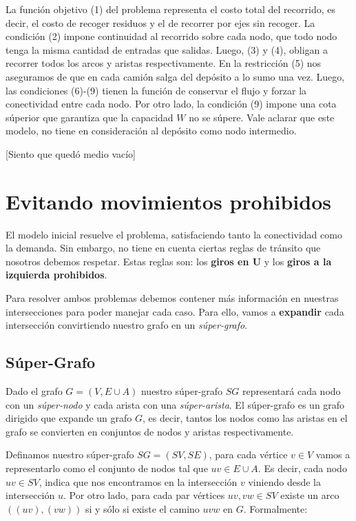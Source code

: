 La función objetivo (1) del problema representa el costo total del recorrido, es decir, el costo 
de recoger residuos y el de recorrer por ejes sin recoger. La condición (2) impone continuidad al 
recorrido sobre cada nodo, que todo nodo tenga la misma cantidad de entradas que salidas. 
Luego, (3) y (4), obligan a recorrer todos los arcos y aristas respectivamente. 
En la restricción (5) nos aseguramos de que en cada camión salga del depósito a lo sumo una vez. 
Luego, las condiciones (6)-(9) tienen la función de conservar el flujo y forzar la conectividad entre cada nodo. 
Por otro lado, la condición (9) impone una cota súperior que garantiza que la capacidad $W$ no se súpere. 
Vale aclarar que este modelo, no tiene en consideración al depósito como nodo intermedio.

[Siento que quedó medio vacío]

\section{Evitando movimientos prohibidos}

El modelo inicial resuelve el problema, satisfaciendo tanto la conectividad como la demanda. 
Sin embargo, no tiene en cuenta ciertas reglas de tránsito que nosotros debemos respetar. 
Estas reglas son: los \textbf{giros en U} y los \textbf{giros a la izquierda prohibidos}.

\vspace{3mm}


Para resolver ambos problemas debemos contener más información en nuestras intersecciones para poder manejar 
cada caso. Para ello, vamos a \textbf{expandir} cada intersección convirtiendo nuestro grafo en un 
\textit{súper-grafo}.  

\subsection{Súper-Grafo}

Dado el grafo $G = (V, E \cup A)$ nuestro súper-grafo $SG$ representará cada nodo con un \textit{súper-nodo} 
y cada arista con una \textit{súper-arista}. El súper-grafo es un grafo dirigido que expande un grafo $G$, 
es decir, tantos los nodos como las aristas en el grafo se convierten en conjuntos de nodos y aristas 
respectivamente. 

\vspace{3mm}

Definamos nuestro súper-grafo $SG = (SV,SE)$, para cada vértice $v \in V$ vamos a representarlo como 
el conjunto de nodos tal que $uv \in E\cup A$. Es decir, cada nodo $uv \in SV$, indica que nos encontramos 
en la intersección $v$ viniendo desde la intersección $u$. 
Por otro lado, para cada par vértices $uv,vw \in SV$ existe un arco $((uv),(vw))$ si y sólo si existe 
el camino $uvw$ en $G$. Formalmente:

